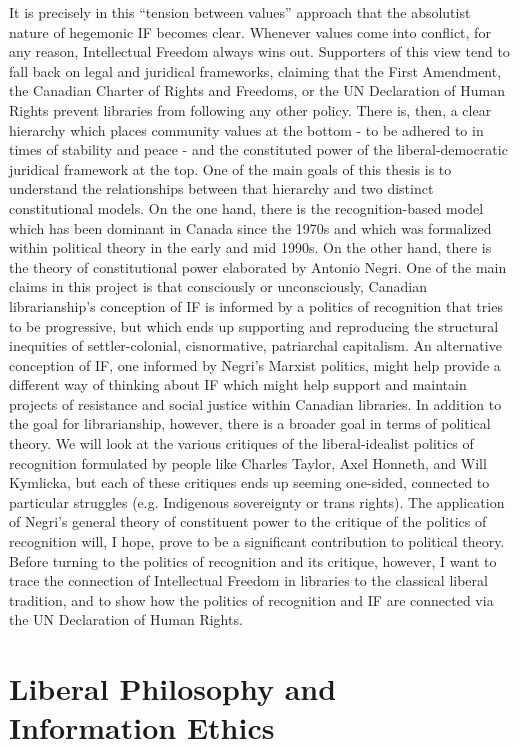 \documentclass[12pt,oneside]{memoir}
\begin{document}
It is precisely in this ``tension between values'' approach that the absolutist nature of hegemonic IF becomes clear. Whenever values come into conflict, for any reason, Intellectual Freedom always wins out. Supporters of this view tend to fall back on legal and juridical frameworks, claiming that the First Amendment, the Canadian Charter of Rights and Freedoms, or the UN Declaration of Human Rights prevent libraries from following any other policy. There is, then, a clear hierarchy which places community values at the bottom - to be adhered to in times of stability and peace - and the constituted power of the liberal-democratic juridical framework at the top. One of the main goals of this thesis is to understand the relationships between that hierarchy and two distinct constitutional models. On the one hand, there is the recognition-based model which has been dominant in Canada since the 1970s and which was formalized within political theory in the early and mid 1990s. On the other hand, there is the theory of constitutional power elaborated by Antonio Negri. One of the main claims in this project is that consciously or unconsciously, Canadian librarianship's conception of IF is informed by a politics of recognition that tries to be progressive, but which ends up supporting and reproducing the structural inequities of settler-colonial, cisnormative, patriarchal capitalism. An alternative conception of IF, one informed by Negri's Marxist politics, might help provide a different way of thinking about IF which might help support and maintain projects of resistance and social justice within Canadian libraries.
In addition to the goal for librarianship, however, there is a broader goal in terms of political theory. We will look at the various critiques of the liberal-idealist politics of recognition formulated by people like Charles Taylor, Axel Honneth, and Will Kymlicka, but each of these critiques ends up seeming one-sided, connected to particular struggles (e.g. Indigenous sovereignty or trans rights). The application of Negri's general theory of constituent power to the critique of the politics of recognition will, I hope, prove to be a significant contribution to political theory. Before turning to the politics of recognition and its critique, however, I want to trace the connection of Intellectual Freedom in libraries to the classical liberal tradition, and to show how the politics of recognition and IF are connected via the UN Declaration of Human Rights.

\section{Liberal Philosophy and Information Ethics}
\label{scrivauto:7}
\end{document}
